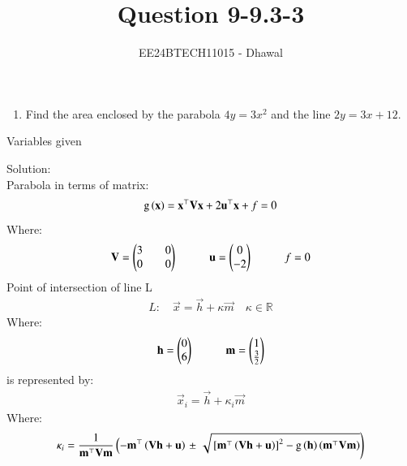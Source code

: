 \documentclass[journal]{IEEEtran}
\numberwithin{equation}{enumi}
\numberwithin{figure}{enumi}
\begin{document}

\title{Question 9-9.3-3}
\author{EE24BTECH11015 - Dhawal}
{\let\newpage\relax\maketitle}
\begin{enumerate}
\item Find the area enclosed by the parabola $4y = 3x^2$ and the line $2y = 3x+12$. 

\end{enumerate}

\begin{table}[h!]    
  \centering
  
  \caption{Variables given}
  \label{tab 1.4.9.2}
\end{table}
Solution:\\
Parabola in terms of matrix:
\begin{align}
\text{g}\left(\mathbf{x}\right)=\mathbf{x}^{\top}\mathbf{V}\mathbf{x}+2\mathbf{u}^{\top}\mathbf{x}+f=0
\end{align}
Where:
\begin{align}
\mathbf{V}=\begin{pmatrix}3&&0\\0&&0\end{pmatrix} \hspace{1cm} \mathbf{u}=\begin{pmatrix}0\\-2\end{pmatrix} \hspace{1cm} f=0
\end{align}
Point of intersection of line L
\begin{align}
	L: \quad \vec{x} = \vec{h} + \kappa \vec{m} \quad \kappa \in \mathbb{R}
\end{align}
Where:
\begin{align}
\mathbf{h}=\begin{pmatrix}0\\6\end{pmatrix} \hspace{1cm} \mathbf{m}=\begin{pmatrix}1\\\frac{3}{2}\end{pmatrix}
\end{align}
is represented by:
\begin{align}
	\vec{x}_i = \vec{h} + \kappa_i \vec{m}
\end{align}
Where:
\begin{align}
	\kappa_i = \frac{1}
{
\mathbf{m}^{\top}\mathbf{V}\mathbf{m}
}
\left(-\mathbf{m}^{\top}\left(\mathbf{V}\mathbf{h}+\mathbf{u}\right)\right.
\pm
\left.\sqrt{
{}\left[
\mathbf{m}^{\top}\left(\mathbf{V}\mathbf{h}+\mathbf{u}\right)
\right]^2
	-\text{g}
\left(\mathbf{h}
\right)
\left(\mathbf{m}^{\top}\mathbf{V}\mathbf{m}\right)
}
\right)
\end{align}
\end{document}
